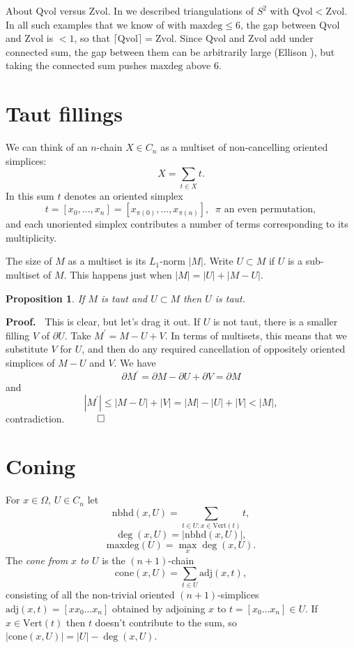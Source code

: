 \documentclass[12pt]{article}
\newtheorem{prop}{Proposition}
\newcommand{\proofstart}{{\noindent \bf Proof.\ }}
\newcommand{\proofend}{$\quad \qed$}
\def\del{\partial}
\newcommand{\kw}{\mathrm}
\newcommand{\cone}{\kw{cone}}
\newcommand{\maxdeg}{\kw{maxdeg}}
\newcommand{\vertices}{\kw{Vert}}
\newcommand{\nbhd}{\kw{nbhd}}
\newcommand{\adj}{\kw{adj}}
\newcommand{\Zvol}{\kw{Zvol}}
\newcommand{\Qvol}{\kw{Qvol}}
\begin{document}
About $\Qvol$ versus $\Zvol$.
In \cite{dew:filling}
we described triangulations of $S^2$ with $\Qvol < \Zvol$.
In all such examples that we know of
with $\maxdeg \leq 6$, the gap between $\Qvol$ and $\Zvol$ is $<1$,
so that
$\lceil \Qvol \rceil = \Zvol$.
Since $\Qvol$ and $\Zvol$
add under connected sum,
the gap between them can be arbitrarily
large
(Ellison \cite{ellison:gap}),
but taking the connected sum pushes $\maxdeg$ above $6$.



\section{Taut fillings}

We can think of an $n$-chain $X \in C_n$ as a multiset of
non-cancelling oriented simplices:
\[
X = \sum_{t \in X} t
.
\]
In this sum $t$ denotes an oriented simplex
\[
t=[x_0,\ldots,x_n]
= [x_{\pi(0)},\ldots,x_{\pi(n)}]
,\;\;\mbox{$\pi$ an even permutation}
,
\]
and each unoriented simplex contributes a number of terms corresponding
to its multiplicity.

The size of $M$ as a multiset is its $L_1$-norm $|M|$.
Write $U \subset M$
if $U$ is a sub-multiset of $M$.
This happens just when
$|M| = |U| + |M-U|$.

\begin{prop} \label{subtaut}
If $M$ is taut and $U \subset M$ then $U$ is taut.
\end{prop}

\proofstart
This is clear, but let's drag it out.
If $U$ is not taut, there is a smaller filling $V$ of $\del U$.
Take $M^\prime = M-U+V$.
In terms of multisets, this means that we substitute $V$ for $U$,
and then do any required cancellation of oppositely oriented simplices
of $M-U$ and $V$.
We have
\[
\del M^\prime = \del M - \del U + \del V = \del M
\]
and
\[
|M^\prime| \leq |M-U| + |V| = |M| - |U| + |V| < |M|
,
\]
contradiction.
\proofend

\section{Coning}
For $x \in \Omega$, $U \in C_n$ let
\[
\nbhd(x,U) = \sum_{ t \in U: x \in \vertices(t) } t
,
\]
\[
\deg(x,U) = |\nbhd(x,U)|
,
\]
\[
\maxdeg(U) = \max_x \deg(x,U)
.
\]
The \emph{cone from $x$ to $U$}
is the $(n+1)$-chain
\[
\cone(x,U) = 
\sum_{t \in U} \adj(x,t)
,
\]
consisting of all the non-trivial oriented
$(n+1)$-simplices $\adj(x,t)=[x x_0\ldots x_n]$ obtained
by adjoining $x$ to  $t = [x_0\ldots x_n] \in U$.
If $x \in \vertices(t)$ then $t$ doesn't contribute to the sum,
so $|\cone(x,U)| = |U| - \deg(x,U)$.
\end{document}
